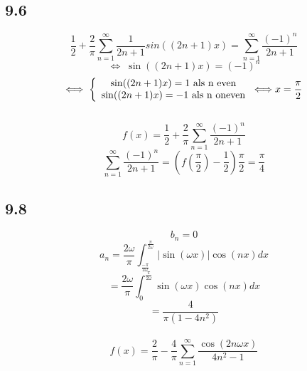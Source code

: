 \documentclass[11pt]{article}
\begin{document}
\subsection*{9.6}
\[
\frac{1}{2} + \frac{2}{\pi} \sum_{n=1}^\infty \frac{1}{2n+1}sin((2n+1)x) = \sum_{n=1}^\infty\frac{(-1)^n}{2n+1}
\]
\[
\Longleftrightarrow\; \sin((2n+1)x) = (-1)^n
\]
\[
\Longleftrightarrow\; \left\lbrace \begin{array}{c c}
\sin((2n+1)x) = 1 \text{ als n even}\\ \sin((2n+1)x) = -1 \text{ als n oneven}
\end{array}
\right. \Longleftrightarrow x = \frac{\pi}{2}
\]\\
\[
f(x) = \frac{1}{2} + \frac{2}{\pi} \sum_{n=1}^\infty\frac{(-1)^n}{2n+1}
\]
\[
\sum_{n=1}^\infty\frac{(-1)^n}{2n+1} = (f(\frac{\pi}{2}) - \frac{1}{2})\frac{\pi}{2} = \frac{\pi}{4}
\]

\subsection*{9.8}
\[ b_n =0\]
\[ a_n = \frac{2\omega}{\pi}\int_{\frac{-\pi}{2\omega}}^{\frac{\pi}{2\omega	}} |\sin(\omega x)|\cos(nx)dx
\]
\[
=\frac{2\omega}{\pi}\int_0^{\frac{\pi}{2\omega	}} \sin(\omega x)\cos(nx)dx
\]
\[
=\frac{4}{\pi(1-4n^2)}
\]\\
\[
f(x) = \frac{2}{\pi} - \frac{4}{\pi}\sum_{n=1}^\infty\frac{\cos(2n\omega x)}{4n^2 -1}
\]
\end{document}
